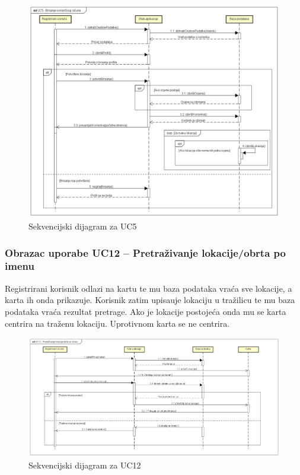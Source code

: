                 \begin{figure}[H]
			        \includegraphics[width=\textwidth]{slike/sekvencijski1.png} 
			            \caption{Sekvencijski dijagram za UC5}
			        \label{fig:Sekvencijski dijagram za UC5}
		        \end{figure}

          \newpage
                
                \subsubsection{Obrazac uporabe UC12 – Pretraživanje lokacije/obrta po imenu}
	
	            Registrirani korisnik odlazi na kartu te mu baza podataka vraća sve lokacije, a karta ih onda prikazuje. Korisnik zatim upisauje lokaciju u tražilicu te mu baza podataka vraća rezultat pretrage. Ako je lokacije postojeća onda mu se karta centrira na traženu lokaciju. Uprotivnom karta se ne centrira.
	            
	            \begin{figure}[H]
			        \includegraphics[width=\textwidth]{slike/sekvencijski2.png} 
			            \caption{Sekvencijski dijagram za UC12}
			        \label{fig:Sekvencijski dijagram za UC12}
		        \end{figure}


